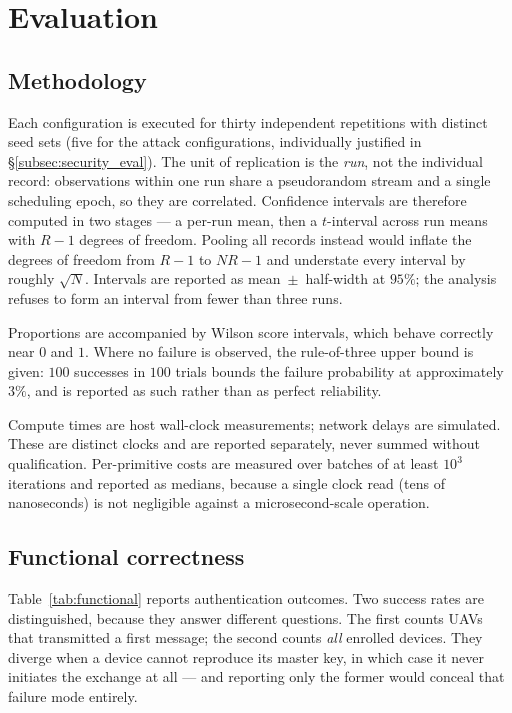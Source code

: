 \documentclass[11pt,a4paper]{article}
\begin{document}
\section{Evaluation}
\label{sec:results}

\subsection{Methodology}
\label{subsec:methodology}

Each configuration is executed for thirty independent repetitions with distinct
seed sets (five for the attack configurations, individually justified in
\S\ref{subsec:security_eval}). The unit of replication is the \emph{run}, not the
individual record:
observations within one run share a pseudorandom stream and a single scheduling
epoch, so they are correlated. Confidence intervals are therefore computed in two
stages --- a per-run mean, then a $t$-interval across run means with $R-1$ degrees
of freedom. Pooling all records instead would inflate the degrees of freedom from
$R-1$ to $NR-1$ and understate every interval by roughly $\sqrt{N}$. Intervals are
reported as mean~$\pm$~half-width at $95\%$; the analysis refuses to form an
interval from fewer than three runs.

Proportions are accompanied by Wilson score intervals, which behave correctly near
$0$ and $1$. Where no failure is observed, the rule-of-three upper bound is given:
$100$ successes in $100$ trials bounds the failure probability at approximately
$3\%$, and is reported as such rather than as perfect reliability.

Compute times are host wall-clock measurements; network delays are simulated.
These are distinct clocks and are reported separately, never summed without
qualification. Per-primitive costs are measured over batches of at least $10^3$
iterations and reported as medians, because a single clock read (tens of
nanoseconds) is not negligible against a microsecond-scale operation.

\subsection{Functional correctness}
\label{subsec:functional}

Table~\ref{tab:functional} reports authentication outcomes. Two success rates are
distinguished, because they answer different questions. The first counts UAVs that
transmitted a first message; the second counts \emph{all} enrolled devices. They
diverge when a device cannot reproduce its master key, in which case it never
initiates the exchange at all --- and reporting only the former would conceal that
failure mode entirely.
\end{document}
